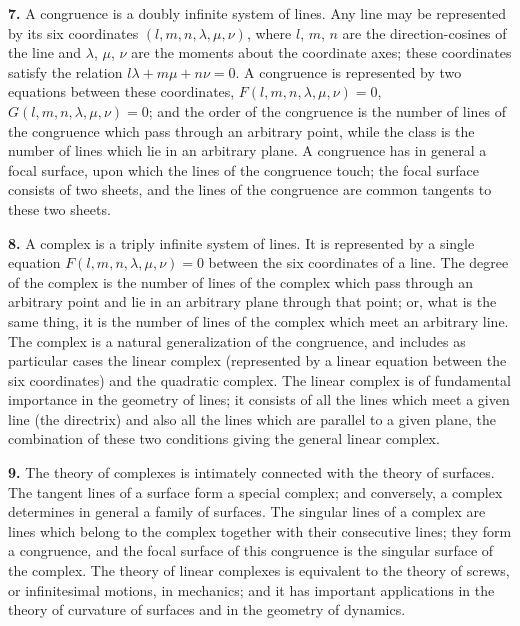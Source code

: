 \documentclass[11pt,a4paper]{article}
\begin{document}
\smallskip

\textbf{7.}\quad
A congruence is a doubly infinite system of lines. Any line may be represented by its six coordinates $(l, m, n, \lambda, \mu, \nu)$, where $l$, $m$, $n$ are the direction-cosines of the line and $\lambda$, $\mu$, $\nu$ are the moments about the coordinate axes; these coordinates satisfy the relation $l\lambda + m\mu + n\nu = 0$. A congruence is represented by two equations between these coordinates, $F(l, m, n, \lambda, \mu, \nu) = 0$, $G(l, m, n, \lambda, \mu, \nu) = 0$; and the order of the congruence is the number of lines of the congruence which pass through an arbitrary point, while the class is the number of lines which lie in an arbitrary plane. A congruence has in general a focal surface, upon which the lines of the congruence touch; the focal surface consists of two sheets, and the lines of the congruence are common tangents to these two sheets.

\textbf{8.}\quad
A complex is a triply infinite system of lines. It is represented by a single equation $F(l, m, n, \lambda, \mu, \nu) = 0$ between the six coordinates of a line. The degree of the complex is the number of lines of the complex which pass through an arbitrary point and lie in an arbitrary plane through that point; or, what is the same thing, it is the number of lines of the complex which meet an arbitrary line. The complex is a natural generalization of the congruence, and includes as particular cases the linear complex (represented by a linear equation between the six coordinates) and the quadratic complex. The linear complex is of fundamental importance in the geometry of lines; it consists of all the lines which meet a given line (the directrix) and also all the lines which are parallel to a given plane, the combination of these two conditions giving the general linear complex.

\textbf{9.}\quad
The theory of complexes is intimately connected with the theory of surfaces. The tangent lines of a surface form a special complex; and conversely, a complex determines in general a family of surfaces. The singular lines of a complex are lines which belong to the complex together with their consecutive lines; they form a congruence, and the focal surface of this congruence is the singular surface of the complex. The theory of linear complexes is equivalent to the theory of screws, or infinitesimal motions, in mechanics; and it has important applications in the theory of curvature of surfaces and in the geometry of dynamics.
\end{document}
